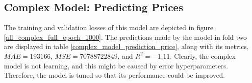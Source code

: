 \documentclass[12pt,twoside]{report}
\begin{document}
\subsection{Complex Model: Predicting Prices}
The training and validation losses of this model are depicted in figure \ref{all_complex_full_epoch_1000}. The predictions made by the model in fold two are displayed in table \ref{complex_model_prediction_price}, along with its metrics, $MAE = 193166$, $MSE = 70788722849$, and $R^2 = -1.11$. Clearly, the complex model is not learning, and this might be caused by error hyperparameters. Therefore, the model is tuned so that its performance could be improved. 
\\
\begin{figure}[!htbp]
	\centering
	\hfill
	\hfill
	\hfil

\end{figure}
\end{document}
